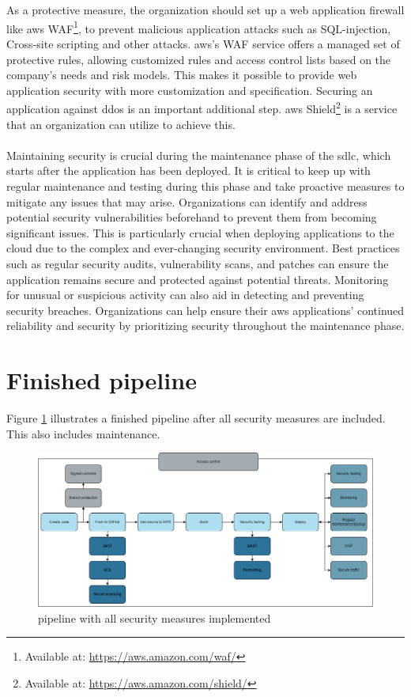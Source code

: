 \\~\\
As a protective measure, the organization should set up a web application firewall like \acrshort{aws} WAF\footnote{Available at: \url{https://aws.amazon.com/waf/}}, to prevent malicious application attacks such as \gls{SQL-injection}, \gls{Cross-site scripting} and other attacks. \acrshort{aws}'s WAF service offers a managed set of protective rules, allowing customized rules and access control lists based on the company's needs and risk models. This makes it possible to provide web application security with more customization and specification. Securing an application against \gls{ddos} is an important additional step. \acrshort{aws} Shield\footnote{Available at: \url{https://aws.amazon.com/shield/}} is a service that an organization can utilize to achieve this. 
\\~\\
Maintaining security is crucial during the maintenance phase of the \acrshort{sdlc}, which starts after the application has been deployed. It is critical to keep up with regular maintenance and testing during this phase and take proactive measures to mitigate any issues that may arise. Organizations can identify and address potential security vulnerabilities beforehand to prevent them from becoming significant issues. This is particularly crucial when deploying applications to the cloud due to the complex and ever-changing security environment. Best practices such as regular security audits, vulnerability scans, and patches can ensure the application remains secure and protected against potential threats. Monitoring for unusual or suspicious activity can also aid in detecting and preventing security breaches. Organizations can help ensure their \acrshort{aws} applications' continued reliability and security by prioritizing security throughout the maintenance phase.


\section{Finished pipeline}
Figure \ref{fig: Pipeline with all security measures implemented} illustrates a finished pipeline after all security measures are included. This also includes maintenance.  

\vspace{2mm}
\begin{figure}[H]
    \centering
    \includegraphics[width=0.8\columnwidth]{Images/FinalPipeline.png}
    \caption{\gls{pipeline} with all security measures implemented}
    \label{fig: Pipeline with all security measures implemented}
\end{figure}



